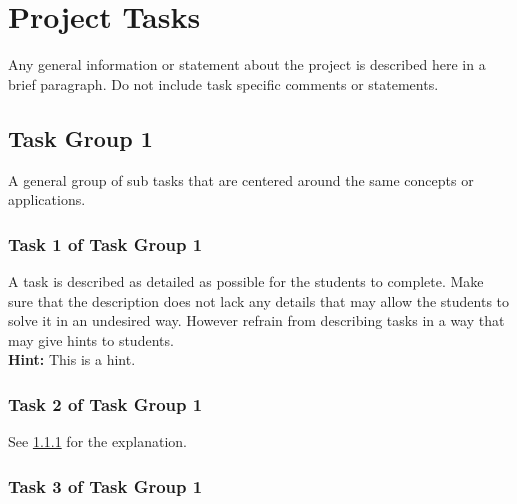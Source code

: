\documentclass[a4paper]{article}
\begin{document}
\newpage

\section{Project Tasks}
\label{tasks}
Any general information or statement about the project is described here in a brief paragraph. Do not include task specific comments or statements.

\subsection{Task Group 1}
A general group of sub tasks that are centered around the same concepts or applications.

\subsubsection{Task 1 of Task Group 1}
\label{taskDescription}
A task is described as detailed as possible for the students to complete. Make sure that the description does not lack any details that may allow the students to solve it in an undesired way. However refrain from describing tasks in a way that may give hints to students.
\\

\noindent \textbf{Hint:} This is a hint.

\subsubsection{Task 2 of Task Group 1}
See \ref{taskDescription} for the explanation.

\subsubsection{Task 3 of Task Group 1}
\end{document}
